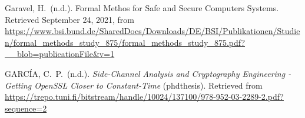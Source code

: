 \documentclass[12pt,twoside]{article}
\begin{document}
{\begin{thebibliography}{1079}
\mdbibitemlabel{}Garavel, H.~(n.d.). Formal Methos for Safe and Secure Computers Systems. Retrieved September 24, 2021, from \href{https://www.bsi.bund.de/SharedDocs/Downloads/DE/BSI/Publikationen/Studien/formal_methods_study_875/formal_methods_study_875.pdf?__blob=publicationFile\%26v=1}{{\ttfamily https://\hspace{0pt}www.\hspace{0pt}bsi.\hspace{0pt}bund.\hspace{0pt}de/\hspace{0pt}SharedDocs/\hspace{0pt}Downloads/\hspace{0pt}DE/\hspace{0pt}BSI/\hspace{0pt}Publikationen/\hspace{0pt}Studien/\hspace{0pt}formal\_\hspace{0pt}methods\_\hspace{0pt}study\_\hspace{0pt}875/\hspace{0pt}formal\_\hspace{0pt}methods\_\hspace{0pt}study\_\hspace{0pt}875.\hspace{0pt}pdf?\_\_\hspace{0pt}blob=\hspace{0pt}publicationFile\&\hspace{0pt}v=\hspace{0pt}1}}%

\mdbibitemlabel{}GARCÍA, C.~P.~(n.d.). \emph{Side-Channel Analysis and Cryptography Engineering - Getting OpenSSL Closer to Constant-Time} (phdthesis). Retrieved from \href{https://trepo.tuni.fi/bitstream/handle/10024/137100/978-952-03-2289-2.pdf?sequence=2}{{\ttfamily https://\hspace{0pt}trepo.\hspace{0pt}tuni.\hspace{0pt}fi/\hspace{0pt}bitstream/\hspace{0pt}handle/\hspace{0pt}10024/\hspace{0pt}137100/\hspace{0pt}978-\hspace{0pt}952-\hspace{0pt}03-\hspace{0pt}2289-\hspace{0pt}2.\hspace{0pt}pdf?\hspace{0pt}sequence=\hspace{0pt}2}}%


\end{thebibliography}}
\end{document}
